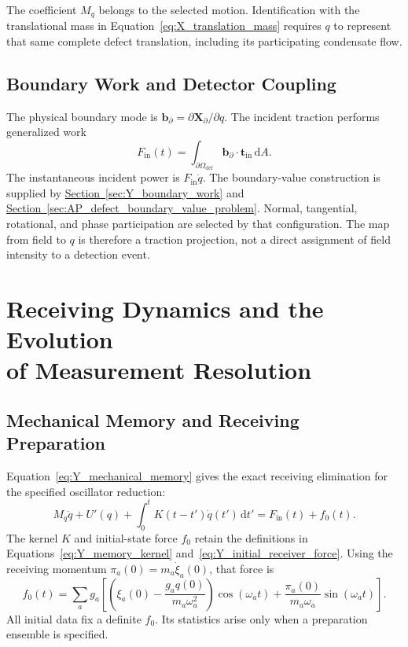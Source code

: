 The coefficient $M_q$ belongs to the selected motion. Identification with the translational mass in Equation~\eqref{eq:X_translation_mass} requires $q$ to represent that same complete defect translation, including its participating condensate flow.

\subsection{Boundary Work and Detector Coupling}

The physical boundary mode is $\mathbf b_\partial=\partial\mathbf X_\partial/\partial q$. The incident traction performs generalized work
\begin{equation}
 F_{\mathrm{in}}(t)=
 \int_{\partial\Omega_{\mathrm{def}}}
 \mathbf b_\partial\cdot\mathbf t_{\mathrm{in}}\,\mathrm dA.
\label{eq:DMR_boundary_work}
\end{equation}
The instantaneous incident power is $F_{\mathrm{in}}\dot q$. The boundary-value construction is supplied by \hyperref[sec:Y_boundary_work]{Section~\ref*{sec:Y_boundary_work}} and \hyperref[sec:AP_defect_boundary_value_problem]{Section~\ref*{sec:AP_defect_boundary_value_problem}}. Normal, tangential, rotational, and phase participation are selected by that configuration. The map from field to $q$ is therefore a traction projection, not a direct assignment of field intensity to a detection event.

\section[Receiving Dynamics and the Evolution of Measurement Resolution]
{Receiving Dynamics and the Evolution\\of Measurement Resolution}
\label{sec:DMR_receiving}

\subsection{Mechanical Memory and Receiving Preparation}

Equation~\eqref{eq:Y_mechanical_memory} gives the exact receiving elimination for the specified oscillator reduction:
\begin{equation}
 M_q\ddot q+U'(q)+\int_0^tK(t-t')\dot q(t')\,\mathrm dt'
 =F_{\mathrm{in}}(t)+f_0(t).
\label{eq:DMR_memory_equation}
\end{equation}
The kernel $K$ and initial-state force $f_0$ retain the definitions in Equations~\eqref{eq:Y_memory_kernel} and~\eqref{eq:Y_initial_receiver_force}. Using the receiving momentum $\pi_a(0)=m_a\dot\xi_a(0)$, that force is
\begin{equation}
 f_0(t)=\sum_a g_a\left[
 \left(\xi_a(0)-\frac{g_aq(0)}{m_a\omega_a^2}\right)
 \cos(\omega_at)+\frac{\pi_a(0)}{m_a\omega_a}\sin(\omega_at)
 \right].
\label{eq:DMR_preparation_force}
\end{equation}
All initial data fix a definite $f_0$. Its statistics arise only when a preparation ensemble is specified.


